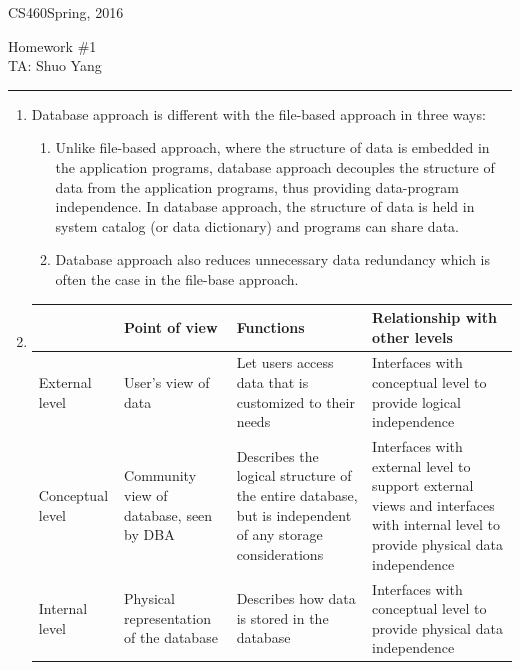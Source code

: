 \documentclass[11pt]{article}
\def\CourseCode{CS460}
\def\AssignmentNo{1}
\def\DateHandedOut{Spring, 2016}
\def\Author{Shuo Yang}
\begin{document}
\noindent

\CourseCode \hfill \DateHandedOut

\begin{center}
Homework \#\AssignmentNo\\
TA: \Author\\
\end{center}

\hrule\smallskip

\begin{enumerate}
\item Database approach is different with the file-based approach in
  three ways:
  \begin{enumerate}
  \item Unlike file-based approach, where the structure of data is
    embedded in the application programs, database approach decouples the
    structure of data from the application programs, thus providing
    data-program independence. In database approach, the structure of
    data is held in system catalog (or data dictionary) and programs
    can share data.
  \item Database approach also reduces unnecessary data redundancy
    which is often the case in the file-base approach.
  \end{enumerate}

\item
  \begin{tabular}{| l | p{3.5cm} | p{5cm} | p{5.5cm} |}
    \hline
    & Point of view & Functions & Relationship with other levels
    \\ \hline
    External level & User's view of data & Let users access data that
    is customized to their needs & Interfaces with conceptual level to
    provide logical independence\\ \hline
    Conceptual level & Community view of database, seen by DBA &
    Describes the logical structure of the entire database, but is
    independent of any storage considerations & Interfaces with external
    level to support external views and interfaces with internal level
    to provide physical data independence \\ \hline
    Internal level & Physical representation of the database &
    Describes how data is stored in the database & Interfaces with
    conceptual level to provide physical data independence \\ \hline
  \end {tabular}


\end{enumerate}
\end{document}

